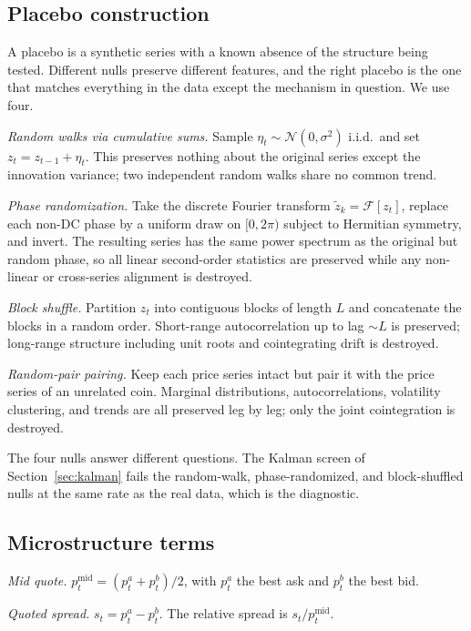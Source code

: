 \documentclass[11pt]{article}
\begin{document}
\subsection{Placebo construction}
\label{app:placebo}

A placebo is a synthetic series with a known absence of the structure being tested.
Different nulls preserve different features, and the right placebo is the one that matches
everything in the data except the mechanism in question. We use four.

\emph{Random walks via cumulative sums.} Sample $\eta_t \sim \mathcal{N}(0, \sigma^2)$
i.i.d.~and set $z_t = z_{t-1} + \eta_t$. This preserves nothing about the original series
except the innovation variance; two independent random walks share no common trend.

\emph{Phase randomization.} Take the discrete Fourier transform $\tilde{z}_k =
\mathcal{F}[z_t]$, replace each non-DC phase by a uniform draw on $[0, 2\pi)$ subject to
Hermitian symmetry, and invert. The resulting series has the same power spectrum as the
original but random phase, so all linear second-order statistics are preserved while any
non-linear or cross-series alignment is destroyed.

\emph{Block shuffle.} Partition $z_t$ into contiguous blocks of length $L$ and concatenate
the blocks in a random order. Short-range autocorrelation up to lag $\sim L$ is preserved;
long-range structure including unit roots and cointegrating drift is destroyed.

\emph{Random-pair pairing.} Keep each price series intact but pair it with the price series
of an unrelated coin. Marginal distributions, autocorrelations, volatility clustering, and
trends are all preserved leg by leg; only the joint cointegration is destroyed.

The four nulls answer different questions. The Kalman screen of Section~\ref{sec:kalman}
fails the random-walk, phase-randomized, and block-shuffled nulls at the same rate as the real data,
which is the diagnostic.

\subsection{Microstructure terms}
\label{app:micro}

\emph{Mid quote.} $p^{\mathrm{mid}}_t = (p^a_t + p^b_t)/2$, with $p^a_t$ the best ask and
$p^b_t$ the best bid.

\emph{Quoted spread.} $s_t = p^a_t - p^b_t$. The relative spread is $s_t /
p^{\mathrm{mid}}_t$.
\end{document}
